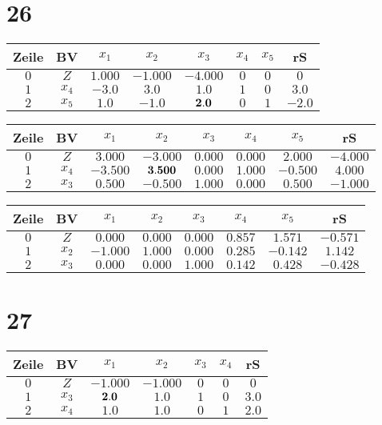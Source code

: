 \documentclass[a4paper]{article}
\begin{document}
\section*{26}

\begin{tabular}{|c|c|ccc|cc|c|} \hline
Zeile & BV & $x_1$ &$x_2$ &$x_3$ &$x_4$ &$x_5$ & rS \\ \hline
$0$ & $Z$ & $1.000$ &$-1.000$ &$-4.000$ &$0$ &$0$ & $0$ \\ \hline
$1$ & $x_4$ & $-3.0$ &$3.0$ &$1.0$ &$1$ &$0$ & $3.0$ \\ 
$2$ & $x_5$ & $1.0$ &$-1.0$ &$\bf 2.0$ &$0$ &$1$ & $-2.0$ \\ 
\hline\end{tabular}

\begin{tabular}{|c|c|ccc|cc|c|} \hline
Zeile & BV & $x_1$ &$x_2$ &$x_3$ &$x_4$ &$x_5$ & rS \\ \hline
$0$ & $Z$ & $3.000$ &$-3.000$ &$0.000$ &$0.000$ &$2.000$ & $-4.000$ \\ \hline
$1$ & $x_4$ & $-3.500$ &$\bf 3.500$ &$0.000$ &$1.000$ &$-0.500$ & $4.000$ \\ 
$2$ & $x_3$ & $0.500$ &$-0.500$ &$1.000$ &$0.000$ &$0.500$ & $-1.000$ \\ 
\hline\end{tabular}

\begin{tabular}{|c|c|ccc|cc|c|} \hline
Zeile & BV & $x_1$ &$x_2$ &$x_3$ &$x_4$ &$x_5$ & rS \\ \hline
$0$ & $Z$ & $0.000$ &$0.000$ &$0.000$ &$0.857$ &$1.571$ & $-0.571$ \\ \hline
$1$ & $x_2$ & $-1.000$ &$1.000$ &$0.000$ &$0.285$ &$-0.142$ & $1.142$ \\ 
$2$ & $x_3$ & $0.000$ &$0.000$ &$1.000$ &$0.142$ &$0.428$ & $-0.428$ \\ 
\hline\end{tabular}



\section*{27}

\begin{tabular}{|c|c|cc|cc|c|} \hline
Zeile & BV & $x_1$ &$x_2$ &$x_3$ &$x_4$ & rS \\ \hline
$0$ & $Z$ & $-1.000$ &$-1.000$ &$0$ &$0$ & $0$ \\ \hline
$1$ & $x_3$ & $\bf 2.0$ &$1.0$ &$1$ &$0$ & $3.0$ \\ 
$2$ & $x_4$ & $1.0$ &$1.0$ &$0$ &$1$ & $2.0$ \\ 
\hline\end{tabular}
\end{document}

